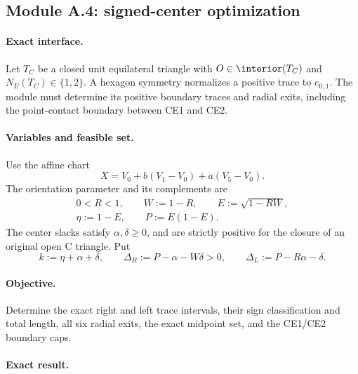 \subsection{Module A.4: signed-center optimization}
\label{sec:signed-ce12-reductions}

\paragraph{Exact interface.}
Let $T_C$ be a closed unit equilateral triangle with
$O\in\interior(T_C)$ and $N_E(T_C)\in\{1,2\}$.  A hexagon symmetry
normalizes a positive trace to $e_{0,1}$.  The module must determine its
positive boundary traces and radial exits, including the point-contact
boundary between CE1 and CE2.

\paragraph{Variables and feasible set.}
Use the affine chart
\[
 X=V_0+b(V_1-V_0)+a(V_5-V_0).
\]
The orientation parameter and its complements are
\[
 \begin{gathered}
 0<R<1,
 \qquad W:=1-R,
 \qquad E:=\sqrt{1-RW},\\
 \eta:=1-E,
 \qquad P:=E(1-E).
 \end{gathered}
\]
The center slacks satisfy $\alpha,\delta\ge0$, and are strictly positive for
the closure of an original open C triangle.  Put
\[
 k:=\eta+\alpha+\delta,
 \qquad
 \Delta_R:=P-\alpha-W\delta>0,
 \qquad
 \Delta_L:=P-R\alpha-\delta.
\]

\paragraph{Objective.}
Determine the exact right and left trace intervals, their sign
classification and total length, all six radial exits, the exact midpoint
set, and the CE1/CE2 boundary caps.

\paragraph{Exact result.}


